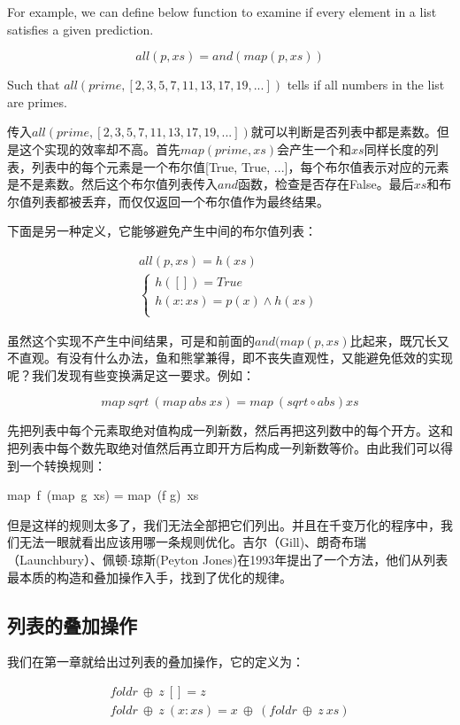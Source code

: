 \documentclass{article}
\begin{document}
For example, we can define below function to examine if every element in a list satisfies a given prediction\cite{GLPJ-1993}.

\[
all(p, xs) = and(map(p, xs))
\]

Such that $all(prime, [2, 3, 5, 7, 11, 13, 17, 19, ...])$ tells if all numbers in the list are primes.

传入$all(prime, [2, 3, 5, 7, 11, 13, 17, 19, ...])$就可以判断是否列表中都是素数。但是这个实现的效率却不高。首先$map(prime, xs)$会产生一个和$xs$同样长度的列表，列表中的每个元素是一个布尔值[True, True, ...]，每个布尔值表示对应的元素是不是素数。然后这个布尔值列表传入$and$函数，检查是否存在False。最后$xs$和布尔值列表都被丢弃，而仅仅返回一个布尔值作为最终结果。

下面是另一种定义，它能够避免产生中间的布尔值列表：

\[
\begin{array}{l}
all(p, xs) = h(xs) \\
  \begin{cases}
  h([]) = True \\
  h(x:xs) = p(x) \land h(xs) \\
  \end{cases}
\end{array}
\]

虽然这个实现不产生中间结果，可是和前面的$and(map(p, xs)$比起来，既冗长又不直观。有没有什么办法，鱼和熊掌兼得，即不丧失直观性，又能避免低效的实现呢？我们发现有些变换满足这一要求。例如：

\[
map\ sqrt\  (map\ abs\ xs) = map\ (sqrt \circ abs) xs
\]

先把列表中每个元素取绝对值构成一列新数，然后再把这列数中的每个开方。这和把列表中每个数先取绝对值然后再立即开方后构成一列新数等价。由此我们可以得到一个转换规则：

\be
map\ f\ (map\ g\ xs) = map\ (f \circ g)\ xs
\ee

但是这样的规则太多了，我们无法全部把它们列出。并且在千变万化的程序中，我们无法一眼就看出应该用哪一条规则优化。吉尔（Gill)、朗奇布瑞（Launchbury）、佩顿$\cdot$琼斯(Peyton Jones)在1993年提出了一个方法，他们从列表最本质的构造和叠加操作入手，找到了优化的规律。

\subsection{列表的叠加操作}

我们在第一章就给出过列表的叠加操作，它的定义为：

\[
\begin{array}{l}
foldr\ \oplus\ z\ [] = z \\
foldr\ \oplus\ z\ (x:xs) = x\ \oplus\ (foldr\ \oplus\ z\ xs) \\
\end{array}
\]
\end{document}
